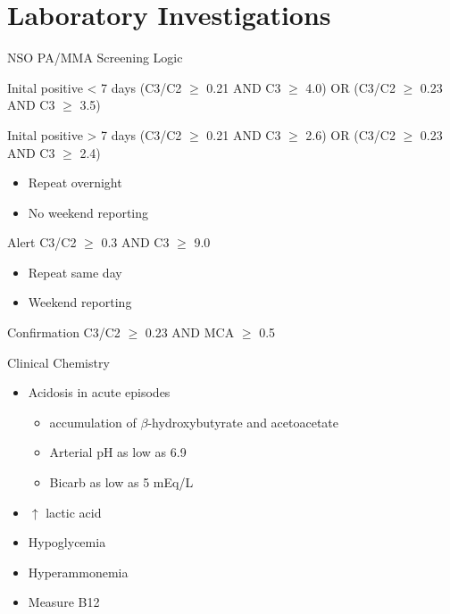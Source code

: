 \documentclass[presentation, smaller]{beamer}
\begin{document}
\section{Laboratory Investigations}
\label{sec:orgheadline18}
\begin{frame}[label={sec:orgheadline13}]{NSO PA/MMA Screening Logic}
\begin{block}{Inital positive \textless{} 7 days}
(C3/C2 \(\ge\) 0.21 AND C3 \(\ge\) 4.0)
OR
(C3/C2 \(\ge\) 0.23 AND C3 \(\ge\) 3.5)
\end{block}
\begin{block}{Inital positive \textgreater{} 7 days}
(C3/C2 \(\ge\) 0.21 AND C3 \(\ge\) 2.6)
OR
(C3/C2 \(\ge\) 0.23 AND C3 \(\ge\) 2.4)
\begin{itemize}
\item Repeat overnight
\item No weekend reporting
\end{itemize}
\end{block}
\begin{block}{Alert}
C3/C2 \(\ge\) 0.3 AND C3 \(\ge\) 9.0
\begin{itemize}
\item Repeat same day
\item Weekend reporting
\end{itemize}
\end{block}
\begin{block}{Confirmation}
C3/C2 \(\ge\) 0.23 AND MCA \(\ge\) 0.5
\end{block}
\end{frame}

\begin{frame}[label={sec:orgheadline14}]{Clinical Chemistry}
\begin{itemize}
\item Acidosis in acute episodes
\begin{itemize}
\item accumulation of \(\beta\)-hydroxybutyrate and acetoacetate
\item Arterial pH as low as 6.9
\item Bicarb as low as 5 mEq/L
\end{itemize}
\item \(\uparrow\) lactic acid
\item Hypoglycemia
\item Hyperammonemia
\item Measure B12
\end{itemize}
\end{frame}
\end{document}
